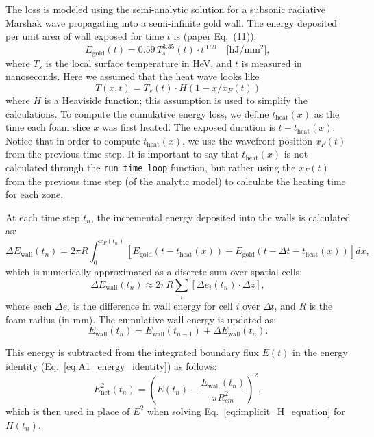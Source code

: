 \documentclass{article}
\begin{document}
The loss is modeled using the semi-analytic solution for a subsonic radiative Marshak wave propagating into a semi-infinite gold wall. The energy deposited per unit area of wall exposed for time $t$ is (paper Eq.~(11)):
\begin{equation}
E_{\mathrm{gold}}(t) = 0.59\,T_s^{3.35}(t)\cdot t^{0.59} \quad \text{[hJ/mm$^2$]},
\end{equation}
where $T_s$ is the local surface temperature in HeV, and $t$ is measured in nanoseconds. Here we assumed that the heat wave looks like
\begin{equation*}
T(x,t) = T_s(t)\cdot H(1-x/x_F(t))
\end{equation*}
where $H$ is a Heaviside function; this assumption is used to simplify the calculations.
To compute the cumulative energy loss, we define $t_{\text{heat}}(x)$ as the time each foam slice $x$ was first heated. The exposed duration is $t - t_{\text{heat}}(x)$. Notice that in order to compute $t_{\text{heat}}(x)$, we use the wavefront position $x_F(t)$ from the previous time step. It is important to say that $t_{\text{heat}}(x)$ is not calculated through the \texttt{run\_time\_loop} function, but rather using the $x_F(t)$ from the previous time step (of the analytic model) to calculate the heating time for each zone.

At each time step $t_n$, the incremental energy deposited into the walls is calculated as:
\begin{equation}
\Delta E_{\text{wall}}(t_n) = 2\pi R \int_0^{x_F(t_n)} \left[ E_{\mathrm{gold}}(t - t_{\text{heat}}(x)) - E_{\mathrm{gold}}(t - \Delta t - t_{\text{heat}}(x)) \right] dx,
\end{equation}
which is numerically approximated as a discrete sum over spatial cells:
\begin{equation}
\Delta E_{\text{wall}}(t_n) \approx 2\pi R \sum_i \left[\Delta e_i(t_n)\cdot \Delta z\right],
\end{equation}
where each $\Delta e_i$ is the difference in wall energy for cell $i$ over $\Delta t$, and $R$ is the foam radius (in mm). The cumulative wall energy is updated as:
\begin{equation}
E_{\text{wall}}(t_n) = E_{\text{wall}}(t_{n-1}) + \Delta E_{\text{wall}}(t_n).
\end{equation}

This energy is subtracted from the integrated boundary flux $E(t)$ in the energy identity (Eq.~\eqref{eq:A1_energy_identity}) as follows:
\begin{equation}
E_{\text{net}}^2(t_n) = \left(E(t_n) - \frac{E_{\text{wall}}(t_n)}{\pi R_{cm}^2}\right)^2,
\end{equation}
which is then used in place of $E^2$ when solving Eq.~\eqref{eq:implicit_H_equation} for $H(t_n)$.
\end{document}
